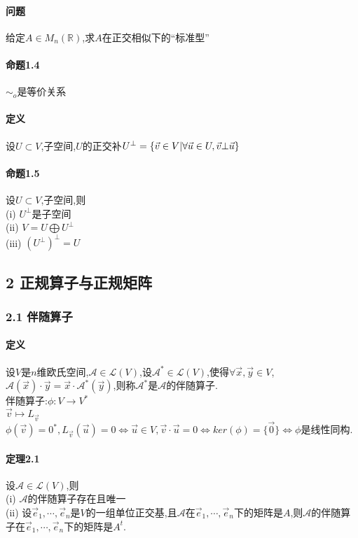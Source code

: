 \documentclass{ctexart}
\begin{document}
\paragraph{问题}
给定$A \in M_{n}(\mathbb{R})$,求$A$在正交相似下的“标准型”

\paragraph{命题1.4}
$\sim_{o}$是等价关系

\paragraph{定义}
设$U \subset V$,子空间,$U$的正交补$U^{\bot} = \{ \vec{v}\in V\arrowvert \forall \vec{u} \in U,\vec{v} \bot \vec{u}\}$

\paragraph{命题1.5}
设$U \subset V$,子空间,则\\
(i) $U^{\bot}$是子空间\\
(ii) $V = U \bigoplus U^{\bot}$\\
(iii) $(U^{\bot})^{\bot}=U$

\subsection{2 正规算子与正规矩阵}

\subsubsection{2.1 伴随算子}

\paragraph{定义}
设$V$是$n$维欧氏空间,$\mathcal{A} \in \mathcal{L}(V)$,设$\mathcal{A}^{*} \in \mathcal{L}(V)$,使得$\forall \vec{x},\vec{y} \in V$,$\mathcal{A}(\vec{x})\cdot \vec{y} = \vec{x} \cdot \mathcal{A}^{*}(\vec{y})$,则称$\mathcal{A}^{*}$是$\mathcal{A}$的伴随算子.\\
伴随算子:$\phi : V \rightarrow V^{*}$\\
$\vec{v} \mapsto L_{\vec{v}}$\\
$\phi(\vec{v}) = 0^{*},L_{\vec{v}}(\vec{u}) = 0 \Leftrightarrow \vec{u} \in V,\vec{v}\cdot\vec{u} = 0 \Leftrightarrow ker(\phi) = \{\vec{0}\} \Leftrightarrow \phi$是线性同构.

\paragraph{定理2.1}
设$\mathcal{A} \in \mathcal{L}(V)$,则\\
(i) $\mathcal{A}$的伴随算子存在且唯一\\
(ii) 设$\vec{e}_{1},\cdots,\vec{e}_{n}$是$V$的一组单位正交基,且$\mathcal{A}$在$\vec{e}_{1},\cdots,\vec{e}_{n}$下的矩阵是$A$,则$\mathcal{A}$的伴随算子在$\vec{e}_{1},\cdots,\vec{e}_{n}$下的矩阵是$A^{t}$.

\ifx\total\undefined 
\end{document}
